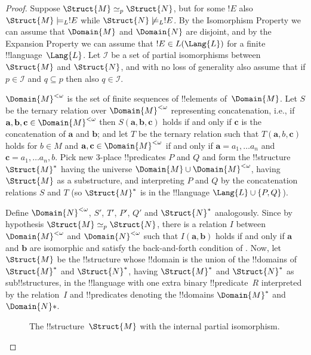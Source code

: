 \documentclass[../../../include/open-logic-section]{subfiles}
\begin{document}
\begin{proof}
Suppose $\Struct{M} \simeq_p \Struct{N}$, but for some $!E$ also
$\Struct{M} \models_L !E$ while $\Struct{N} \not\models_L !E$. By the
Isomorphism Property we can assume that $\Domain{M}$ and $\Domain{N}$
are disjoint, and by the Expansion Property we can assume that $!E \in
L(\Lang{L})$ for a finite !!{language}~$\Lang{L}$. Let $\mathcal{I}$
be a set of partial isomorphisms between $\Struct{M}$ and
$\Struct{N}$, and with no loss of generality also assume that if $p
\in \mathcal{I}$ and $q \subseteq p$ then also $q \in \mathcal{I}$.

$\Domain{M}^{<\omega}$ is the set of finite sequences of !!{element}s
of~$\Domain{M}$. Let $S$ be the ternary relation over $\Domain{M}^{<\omega}$
representing concatenation, i.e., if $\mathbf{a}, \mathbf{b},
\mathbf{c} \in \Domain{M}^{<\omega}$ then $S(\mathbf{a}, \mathbf{b},
\mathbf{c})$ holds if and only if $\mathbf{c}$ is the concatenation of
$\mathbf{a}$ and $\mathbf{b}$; and let $T$ be the ternary relation
such that $T(\mathbf{a}, b, \mathbf{c})$ holds for $b \in M$ and
$\mathbf{a}, \mathbf{c} \in \Domain{M}^{<\omega}$ if and only if $\mathbf{a} =
a_1, \dots a_n$ and $\mathbf{c} = a_1, \dots a_n, b$.  Pick new
3-place !!{predicate}s $P$ and $Q$ and form the !!{structure}
$\Struct{M}^*$ having the universe $\Domain{M} \cup \Domain{M}^{<\omega}$, having
$\Struct{M}$ as a substructure, and interpreting $P$ and $Q$ by the
concatenation relations $S$ and $T$ (so $\Struct{M}^*$ is in the
!!{language} $\Lang{L} \cup \{ P, Q\}$).

Define $\Domain{N}^{<\omega}$, $S'$, $T'$, $P'$, $Q'$ and
$\Struct{N}^*$ analogously. Since by hypothesis $\Struct{M} \simeq_p
\Struct{N}$, there is a relation $I$ between $\Domain{M}^{<\omega}$
and $\Domain{N}^{<\omega}$ such that $I(\mathbf{a}, \mathbf{b})$
holds if and only if $\mathbf{a}$ and $\mathbf{b}$ are isomorphic and
satisfy the back-and-forth condition of
.  Now, let $\Struct{M}$ be the
!!{structure} whose !!{domain} is the union of the !!{domain}s of
$\Struct{M}^*$ and $\Struct{N}^*$, having $\Struct{M}^*$ and
$\Struct{N}^*$ as sub!!{structure}s, in the !!{language} with one extra
binary !!{predicate}~$R$ interpreted by the relation~$I$ and
!!{predicate}s denoting the !!{domain}s $\Domain{M}^*$
and~$\Domain{N}*$.

\begin{figure}[h]
  \centering
  \caption{The !!{structure}~$\Struct{M}$ with the internal
    partial isomorphism.}
\end{figure}


\end{proof}
\end{document}
